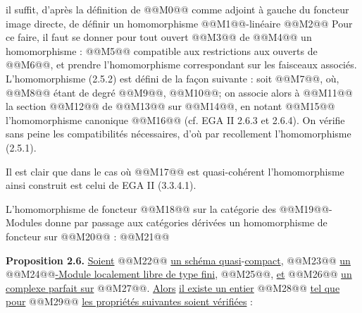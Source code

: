 
il
suffit, d'après la définition de @@M0@@ comme adjoint à gauche du foncteur image directe, de définir un homomorphisme @@M1@@-linéaire
@@M2@@
Pour ce faire, il faut se donner pour tout ouvert @@M3@@ de @@M4@@ un homomorphisme :
@@M5@@
compatible aux restrictions aux ouverts de @@M6@@, et prendre l'homomorphisme correspondant sur les faisceaux associés. L'homomorphisme (2.5.2) est défini de la façon suivante : soit @@M7@@, où, @@M8@@ étant de degré @@M9@@, @@M10@@; on associe alors à @@M11@@ la section @@M12@@ de @@M13@@ sur @@M14@@, en notant @@M15@@ l'homomorphisme canonique @@M16@@ (cf. EGA II 2.6.3 et 2.6.4). On vérifie sans peine les compatibilités nécessaires, d'où par recollement l'homomorphisme (2.5.1).

Il est clair que dans le cas où @@M17@@ est quasi-cohérent l'homomorphisme ainsi construit est celui de EGA II (3.3.4.1).

L'homomorphisme de foncteur @@M18@@ sur la catégorie des @@M19@@-Modules donne par passage aux catégories dérivées un homomorphisme de foncteur sur @@M20@@ :
@@M21@@

\textbf{Proposition 2.6.} \uline{Soient} @@M22@@ \uline{un schéma quasi}-\uline{compact}, @@M23@@ \uline{un} @@M24@@\uline{-Module localement libre de type fini}, @@M25@@, \uline{et} @@M26@@ \uline{un complexe parfait sur} @@M27@@. \uline{Alors} \uline{il existe un entier} @@M28@@ \uline{tel que pour} @@M29@@ \uline{les propriétés suivantes soient vérifiées} :
